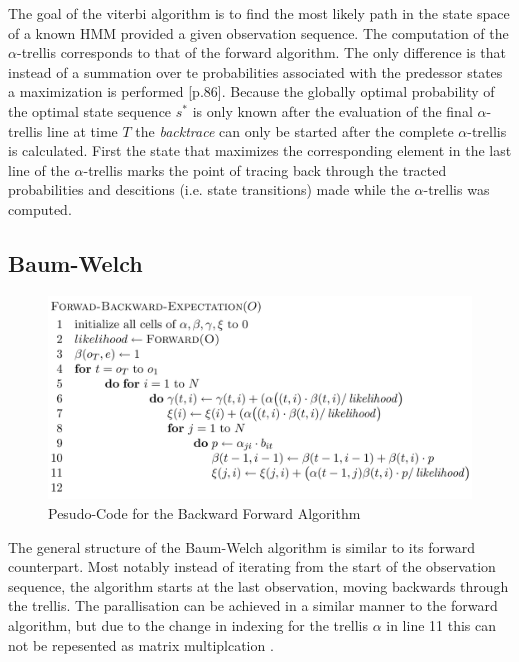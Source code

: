 \documentclass[english, paper=a4]{scrartcl}
\begin{document}
The goal of the viterbi algorithm is to find the most likely path in the state space of a known HMM provided a given observation sequence. The computation of the $\alpha$-trellis corresponds to that of the forward algorithm. The only difference is that instead of a summation over te probabilities associated with the predessor states a maximization is performed \cite{mm_pr}[p.86].
Because the globally optimal probability of the optimal state sequence $s^*$ is only known after the evaluation of the final $\alpha$-trellis line at time $T$ the \emph{backtrace} can only be started after the complete $\alpha$-trellis is calculated.
First the state that maximizes the corresponding element in the last line of the $\alpha$-trellis marks the point of tracing back through the tracted probabilities and descitions (i.e. state transitions) made while the $\alpha$-trellis was computed.

\subsection{Baum-Welch}


\begin{figure}[H]

\centering
\includegraphics[scale=0.4]{"BW"}
 \caption{Pesudo-Code for the Backward Forward Algorithm \cite{cuhmm}}

\end{figure}

The general structure of the Baum-Welch algorithm is similar to its forward counterpart. Most notably instead of iterating from the start of the observation sequence, the algorithm starts at the last observation, moving backwards through the trellis. The parallisation can be achieved in a similar manner to the forward algorithm, but due to the change in indexing for the trellis \(\alpha\) in line 11 this can not be repesented as matrix multiplcation \cite{cuhmm}.
\end{document}
